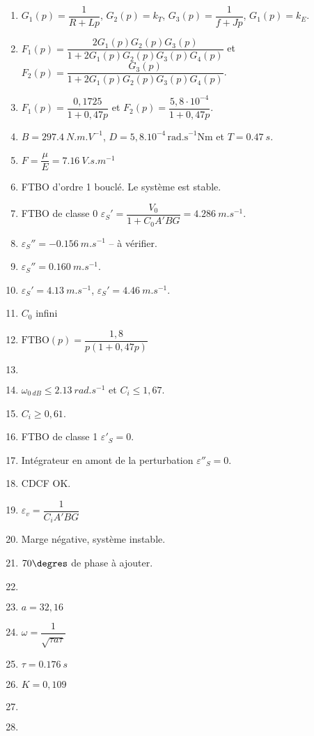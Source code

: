 \ifcolle
\else
\begin{solution}
\begin{enumerate}
\item $G_1(p)=\dfrac{1}{R+Lp}$, $G_2(p)=k_T$, $G_3(p)=\dfrac{1}{f+Jp}$, $G_1(p)=k_E$. 
\item $F_1(p)=\dfrac{2G_1(p)G_2(p)G_3(p)}{1+2G_1(p)G_2(p)G_3(p)G_4(p)}$ et  
$F_2(p)=\dfrac{G_3(p)}{1+2G_1(p)G_2(p)G_3(p)G_4(p)}$.
\item $F_1(p)=\dfrac{0,1725}{1+0,47p}$ et $F_2(p)=\dfrac{5,8 \cdot 10^{-4}}{1+0,47p}$.
\item $B=\SI{297,4}{N.m.V^{-1}}$, $D=5,8.10^{-4}\,\text{rad.s}^{-1}\text{Nm}$ et $T=\SI{0,47}{s}$.
\item $F=\dfrac{\mu}{E}=\SI{7,16}{V.s.m^{-1}}$
\item FTBO d'ordre 1 bouclé. Le système est stable.
\item  FTBO de classe 0 $\varepsilon_S'=\dfrac{V_0}{1+C_0A'BG}=\SI{4,286}{m.s^{-1}}$.
\item $\varepsilon_S''=\SI{-0,156}{m.s^{-1}}$ -- à vérifier.
\item $\varepsilon_S''=\SI{0,160}{m.s^{-1}}$.
\item $\varepsilon_S'=\SI{4,13}{m.s^{-1}}$, $\varepsilon_S'=\SI{4,46}{m.s^{-1}}$.
\item $C_0$ infini
\item $\text{FTBO}(p)=\dfrac{1,8}{p\left(1+0,47 p \right)}$
\item $\quad$
\item $\omega_{\SI{0}{dB}}\leq\SI{2,13}{rad.s^{-1}}$ et $C_i\leq1,67$.
\item $C_i\geq 0,61$.
\item FTBO de classe 1 $\varepsilon'_S=0$.
\item Intégrateur en amont de la perturbation $\varepsilon''_S=0$.
\item CDCF OK.
\item $\varepsilon_v=\dfrac{1}{C_iA'BG}$
\item Marge négative, système instable.
\item $70\degres$ de phase à ajouter.
\item $\quad$
\item $a=32,16$
\item $\omega=\dfrac{1}{\sqrt{\tau a \tau}}$
\item $\tau = \SI{0,176}{s}$
\item $K=0,109$
\item $\quad$
\item $\quad$
\end{enumerate}
\end{solution}


\fi
